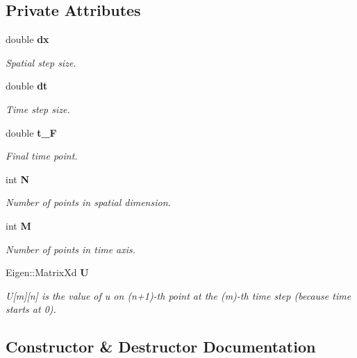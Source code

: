 \subsection*{Private Attributes}
\begin{CompactItemize}
\item 
double \bf{dx}
\begin{CompactList}\small\item\em Spatial step size. \item\end{CompactList}\item 
double \bf{dt}
\begin{CompactList}\small\item\em Time step size. \item\end{CompactList}\item 
double \bf{t\_\-F}
\begin{CompactList}\small\item\em Final time point. \item\end{CompactList}\item 
int \bf{N}
\begin{CompactList}\small\item\em Number of points in spatial dimension. \item\end{CompactList}\item 
int \bf{M}
\begin{CompactList}\small\item\em Number of points in time axis. \item\end{CompactList}\item 
Eigen::Matrix\-Xd \bf{U}
\begin{CompactList}\small\item\em U[m][n] is the value of u on (n+1)-th point at the (m)-th time step (because time starts at 0). \item\end{CompactList}\end{CompactItemize}


\subsection{Constructor \& Destructor Documentation}
